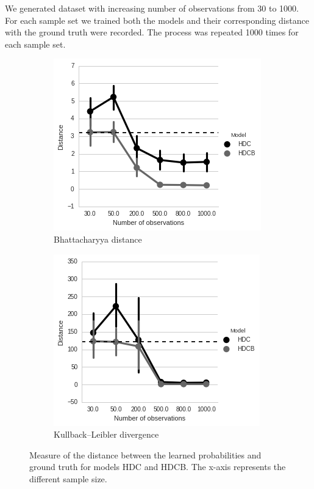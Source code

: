 We generated dataset with increasing number of observations from 30 to 1000. For each sample set we trained both the models and their corresponding distance with the ground truth were recorded. The process was repeated 1000 times for each sample set.



\begin{figure}[htp]
\centering

\begin{subfigure}{.45\textwidth}
  \centering
  \includegraphics[width=\linewidth]{images/HDCB-Bhattacharya-Distance.png}
    \caption{Bhattacharyya distance}
\end{subfigure}
\begin{subfigure}{.45\textwidth}
  \centering
  \includegraphics[width=\linewidth]{images/HDCB-KL-Distance.png}
    \caption{Kullback–Leibler divergence}
\end{subfigure}

\caption[Model evaluation]{Measure of the distance between the learned probabilities and ground truth for models HDC and HDCB. The x-axis represents the different sample size.}
\label{fig:B-KL-evaluation}
\end{figure}


